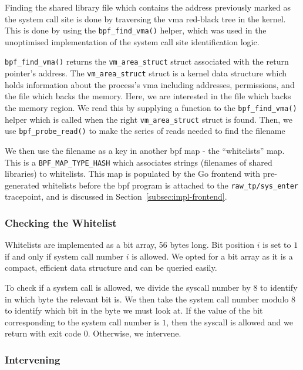 Finding the shared library file which contains the address previously marked as
the system call site is done by traversing the \ac{vma} red-black tree in the
kernel. This is done by using the \texttt{bpf\_find\_vma()} helper, which was used
in the unoptimised implementation of the system call site identification logic.

\texttt{bpf\_find\_vma()} returns the \texttt{vm\_area\_struct} struct associated with the
return pointer's address. The \texttt{vm\_area\_struct} struct is a kernel data structure
which holds information about the process's \ac{vma} including addresses,
permissions, and the file which backs the memory. Here, we are interested in the
file which backs the memory region. We read this by supplying a function
to the \texttt{bpf\_find\_vma()} helper which is called when the right
\texttt{vm\_area\_struct} struct is found. Then, we use \texttt{bpf\_probe\_read()} to make
the series of reads needed to find the filename

We then use the filename as a key in another \ac{bpf} map - the ``whitelists''
map. This is a \texttt{BPF\_MAP\_TYPE\_HASH} which associates strings (filenames
of shared libraries) to whitelists. This map is populated by the Go frontend
with pre-generated whitelists before the \ac{bpf} program is attached to the 
\texttt{raw\_tp/sys\_enter} tracepoint, and is discussed in 
Section~\ref{subsec:impl-frontend}.

\subsubsection{Checking the Whitelist}

Whitelists are implemented as a bit array, 56 bytes long. Bit position $i$ is
set to $1$ if and only if system call number $i$ is allowed. We opted for a bit
array as it is a compact, efficient data structure and can be queried easily.

To check if a system call is allowed, we divide the syscall number by 8 to identify in 
which byte the relevant bit is. We then take the system call number modulo 8 to
identify which bit in the byte we must look at. If the value of the bit
corresponding to the system call number is $1$, then the syscall is allowed and we
return with exit code 0. Otherwise, we intervene.

\subsubsection{Intervening}\label{subsubsec:impl-intervening}

